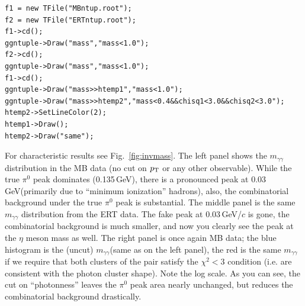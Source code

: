 \documentclass[12pt,letterpaper,aps,prc,superscriptaddress,showpacs,
longbibliography,nofootinbib,floatfix,onecolumn]{revtex4-1}
\newcommand{\pt}{\mbox{$p_{\rm T}$}\xspace}
\newcommand{\piz}{\mbox{$\pi^0$}\xspace}
\newcommand{\mgg}{\mbox{$m_{\gamma\gamma}$}\xspace}
\newcommand{\gev}{\mbox{GeV}\xspace}
\newcommand{\gevc}{\mbox{GeV/$c$}\xspace}
\begin{document}
\noindent
\begin{verbatim}
f1 = new TFile("MBntup.root");
f2 = new TFile("ERTntup.root");
f1->cd();
ggntuple->Draw("mass","mass<1.0");
f2->cd();
ggntuple->Draw("mass","mass<1.0");
f1->cd();
ggntuple->Draw("mass>>htemp1","mass<1.0");
ggntuple->Draw("mass>>htemp2","mass<0.4&&chisq1<3.0&&chisq2<3.0");
htemp2->SetLineColor(2);
htemp1->Draw();
htemp2->Draw("same");
\end{verbatim}
For characteristic results see Fig.~\ref{fig:invmass}.  The left panel
shows the \mgg distribution in the MB data (no cut on \pt or any
other observable).  While the true \piz peak dominates (0.135\,\gev),
there is a pronounced peak at 0.03\,\gev (primarily due to 
``minimum ionization'' hadrons),
also, the combinatorial background under the true \piz peak is
substantial.  The middle panel is the same \mgg distribution from the
ERT data.  The fake peak at 0.03\,\gevc is gone, the combinatorial
background is much smaller, and now you clearly see the peak at the
$\eta$ meson mass as well.  The right panel is once again MB data; the
blue histogram is the (uncut) \mgg (same as on the left panel), the
red is the same \mgg if we require that both clusters of the pair
satisfy the $\chi^2<3$ condition (i.e. are consistent with the photon
cluster shape).  Note the log scale.  As you can see, the cut on
``photonness'' leaves the \piz peak area nearly unchanged, but reduces
the combinatorial background drastically.

\newpage
\end{document}
